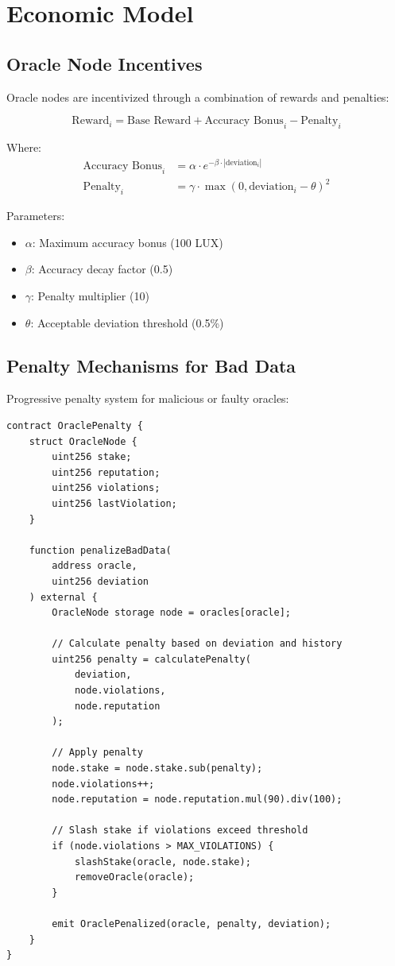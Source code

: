 \section{Economic Model}


\subsection{Oracle Node Incentives}

Oracle nodes are incentivized through a combination of rewards and penalties:

\begin{equation}
\text{Reward}_i = \text{Base Reward} + \text{Accuracy Bonus}_i - \text{Penalty}_i
\end{equation}

Where:
\begin{align}
\text{Accuracy Bonus}_i &= \alpha \cdot e^{-\beta \cdot |\text{deviation}_i|} \\
\text{Penalty}_i &= \gamma \cdot \max(0, \text{deviation}_i - \theta)^2
\end{align}

Parameters:
\begin{itemize}
    \item $\alpha$: Maximum accuracy bonus (100 LUX)
    \item $\beta$: Accuracy decay factor (0.5)
    \item $\gamma$: Penalty multiplier (10)
    \item $\theta$: Acceptable deviation threshold (0.5\%)
\end{itemize}

\subsection{Penalty Mechanisms for Bad Data}

Progressive penalty system for malicious or faulty oracles:

\begin{lstlisting}[caption={Oracle Penalty System}]
contract OraclePenalty {
    struct OracleNode {
        uint256 stake;
        uint256 reputation;
        uint256 violations;
        uint256 lastViolation;
    }
    
    function penalizeBadData(
        address oracle,
        uint256 deviation
    ) external {
        OracleNode storage node = oracles[oracle];
        
        // Calculate penalty based on deviation and history
        uint256 penalty = calculatePenalty(
            deviation,
            node.violations,
            node.reputation
        );
        
        // Apply penalty
        node.stake = node.stake.sub(penalty);
        node.violations++;
        node.reputation = node.reputation.mul(90).div(100);
        
        // Slash stake if violations exceed threshold
        if (node.violations > MAX_VIOLATIONS) {
            slashStake(oracle, node.stake);
            removeOracle(oracle);
        }
        
        emit OraclePenalized(oracle, penalty, deviation);
    }
}
\end{lstlisting}

